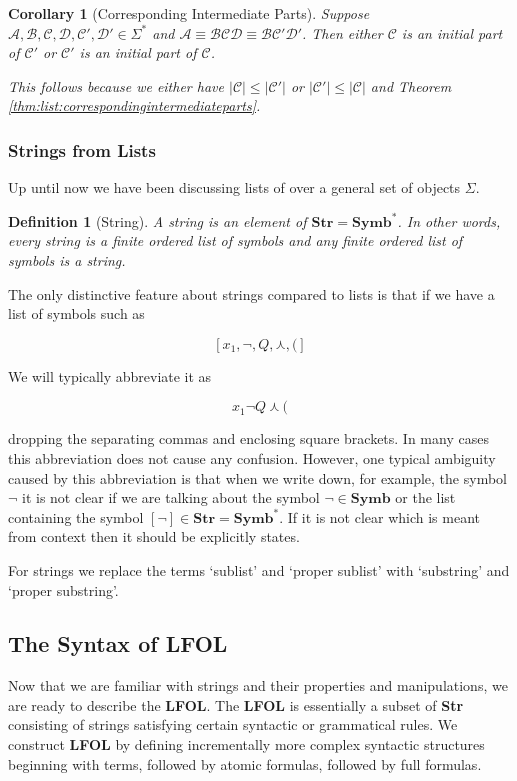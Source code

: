 \documentclass[12pt]{article}
\theoremstyle{break}
\newtheorem{definition}{Definition}[section]
\theoremstyle{break}
\theoremstyle{break}
\newtheorem{corollary}[theorem]{Corollary}
\theoremstyle{break}
\theoremstyle{break}
\newtheorem{informal definition}[definition]{Informal Definition}
\newcommand{\mc}[1]{\mathcal{#1}}
\begin{document}
\begin{corollary}[Corresponding Intermediate Parts]
\label{corr:list:correspondingintermediateparts}
Suppose $\mc{A}, \mc{B}, \mc{C}, \mc{D}, \mc{C}', \mc{D}'\in \Sigma^*$ and $\mc{A}\equiv \mc{B}\mc{C}\mc{D} \equiv \mc{B}\mc{C}'\mc{D}'$.
Then either $\mc{C}$ is an initial part of $\mc{C}'$ or $\mc{C}'$ is an initial part of $\mc{C}$.

This follows because we either have $|\mc{C}|\le |\mc{C}'|$ or $|\mc{C}'|\le |\mc{C}|$ and Theorem \ref{thm:list:correspondingintermediateparts}.
\end{corollary}

\subsubsection{Strings from Lists}
Up until now we have been discussing lists of over a general set of objects $\Sigma$.

\begin{definition}[String]
A string is an element of $\textbf{Str} = \textbf{Symb}^*$.
In other words, every string is a finite ordered list of symbols and any finite ordered list of symbols is a string.
\end{definition}

The only distinctive feature about strings compared to lists is that if we have a list of symbols such as

$$
[x_1, \lnot, Q, \curlywedge, (]
$$

We will typically abbreviate it as

$$
x_1\lnot Q\curlywedge (
$$

dropping the separating commas and enclosing square brackets.
In many cases this abbreviation does not cause any confusion.
However, one typical ambiguity caused by this abbreviation is that when we write down, for example, the symbol $\lnot$ it is not clear if we are talking about the symbol $\lnot\in\textbf{Symb}$ or the list containing the symbol $[\lnot] \in \textbf{Str}=\textbf{Symb}^*$.
If it is not clear which is meant from context then it should be explicitly states.

For strings we replace the terms `sublist' and `proper sublist' with `substring' and `proper substring'.
\subsection{The Syntax of LFOL}

Now that we are familiar with strings and their properties and manipulations, we are ready to describe the \textbf{LFOL}.
The \textbf{LFOL} is essentially a subset of \textbf{Str} consisting of strings satisfying certain syntactic or grammatical rules.
We construct \textbf{LFOL} by defining incrementally more complex syntactic structures beginning with terms, followed by atomic formulas, followed by full formulas.
\end{document}
